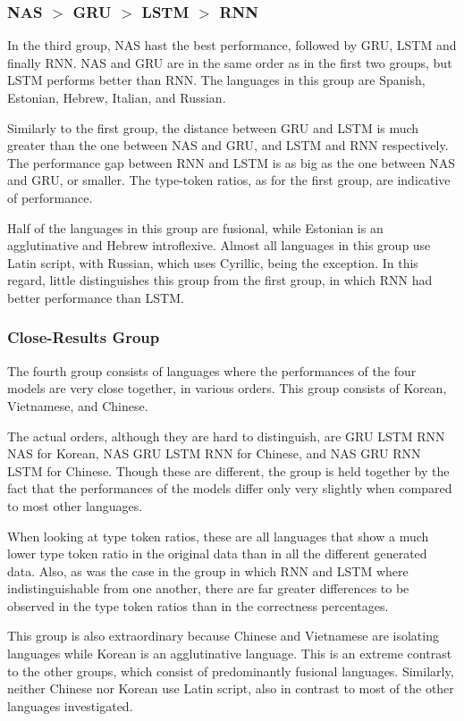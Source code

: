 \documentclass[11pt,a4paper,twoside,openright]{scrbook}
\begin{document}
\subsubsection{NAS $>$ GRU $>$ LSTM $>$ RNN}
In the third group, NAS hast the best performance, followed by GRU, LSTM and finally RNN. NAS and GRU are in the same order as in the first two groups, but LSTM performs better than RNN. The languages in this group are Spanish, Estonian, Hebrew, Italian, and Russian. 

Similarly to the first group, the distance between GRU and LSTM is much greater than the one between NAS and GRU, and LSTM and RNN respectively. The performance gap between RNN and LSTM is as big as the one between NAS and GRU, or smaller. The type-token ratios, as for the first group, are indicative of performance.

Half of the languages in this group are fusional, while Estonian is an agglutinative and Hebrew introflexive. Almost all languages in this group use Latin script, with Russian, which uses Cyrillic, being the exception. In this regard, little distinguishes this group from the first group, in which RNN had better performance than LSTM. 

\subsubsection{Close-Results Group}
The fourth group consists of languages where the performances of the four models are very close together, in various orders. This group consists of Korean, Vietnamese, and Chinese. 

The actual orders, although they are hard to distinguish, are GRU LSTM RNN NAS for Korean, NAS GRU LSTM RNN for Chinese, and NAS GRU RNN LSTM for Chinese. Though these are different, the group is held together by the fact that the performances of the models differ only very slightly when compared to most other languages. 

When looking at type token ratios, these are all languages that show a much lower type token ratio in the original data than in all the different generated data. Also, as was the case in the group in which RNN and LSTM where indistinguishable from one another, there are far greater differences to be observed in the type token ratios than in the correctness percentages. 

This group is also extraordinary because Chinese and Vietnamese are isolating languages while Korean is an agglutinative language. This is an extreme contrast to the other groups, which consist of predominantly fusional languages. Similarly, neither Chinese nor Korean use Latin script, also in contrast to most of the other languages investigated. 
\end{document}
